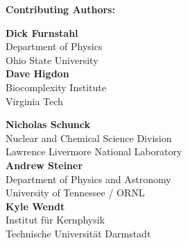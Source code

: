 {\bf \large Contributing Authors:}
\vspace{5mm}

\begin{minipage}[t]{0.5\linewidth}

\textbf{Dick Furnstahl}\\
Department of Physics\\ 
Ohio State University\\

\textbf{Dave Higdon}\\
Biocomplexity Institute\\
Virginia Tech


\end{minipage}
\hfill
\begin{minipage}[t]{0.5\linewidth}

{\bf Nicholas Schunck}\\
Nuclear and Chemical Science Division \\
Lawrence Livermore National Laboratory\\

{\bf Andrew Steiner}\\
Department of Physics and Astronomy\\
University of Tennessee / ORNL\\

{\bf Kyle Wendt}\\
Institut für Kernphysik\\
Technische Universität Darmstadt \\

\end{minipage}

